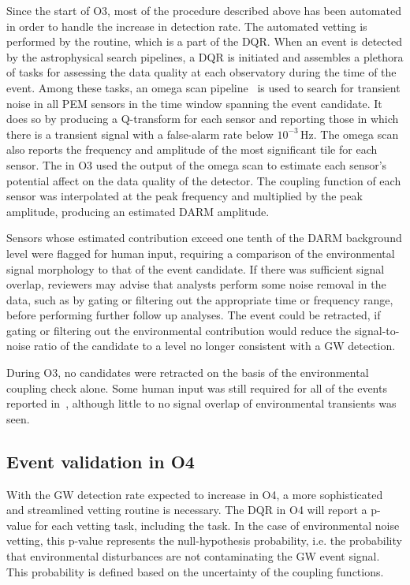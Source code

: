 Since the start of \ac{O3}, most of the procedure described above has been automated in order to handle the increase in detection rate.
The automated vetting is performed by the  routine, which is a part of the \ac{DQR}.
When an event is detected by the astrophysical search pipelines, a \ac{DQR} is initiated and assembles a plethora of tasks for assessing the data quality at each observatory during the time of the event.
Among these tasks, an omega scan pipeline~\citep{Davis_2021, Chatterji_2004} is used to search for transient noise in all \ac{PEM} sensors in the time window spanning the event candidate.
It does so by producing a Q-transform for each sensor and reporting those in which there is a transient signal with a false-alarm rate below $10^{-3}$\,Hz.
The omega scan also reports the frequency and amplitude of the most significant tile for each sensor.
The  in \ac{O3} used the output of the omega scan to estimate each sensor's potential affect on the data quality of the detector.
The coupling function of each sensor was interpolated at the peak frequency and multiplied by the peak amplitude, producing an estimated \ac{DARM} amplitude.

Sensors whose estimated contribution exceed one tenth of the \ac{DARM} background level were flagged for human input, requiring a comparison of the environmental signal morphology to that of the event candidate.
If there was sufficient signal overlap, reviewers may advise that analysts perform some noise removal in the data, such as by gating or filtering out the appropriate time or frequency range, before performing further follow up analyses.
The event could be retracted, if gating or filtering out the environmental contribution would reduce the signal-to-noise ratio of the candidate to a level no longer consistent with a GW detection.

During \ac{O3}, no candidates were retracted on the basis of the environmental coupling check alone.
Some human input was still required for all of the \XX events reported in~\citep{gwtc2}, although little to no signal overlap of environmental transients was seen.


\subsection{Event validation in O4}

With the \ac{GW} detection rate expected to increase in \ac{O4}, a more sophisticated and streamlined vetting routine is necessary.
The \ac{DQR} in \ac{O4} will report a p-value for each vetting task, including the  task.
In the case of environmental noise vetting, this p-value represents the null-hypothesis probability, i.e. the probability that environmental disturbances are not contaminating the \ac{GW} event signal.
This probability is defined based on the uncertainty of the coupling functions.

